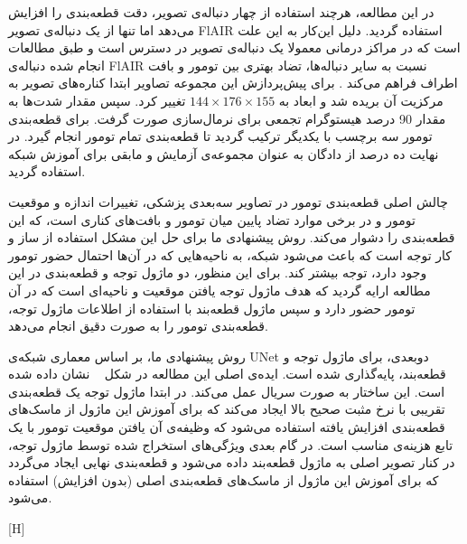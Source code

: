 در این مطالعه، هرچند استفاده از چهار دنباله‌ی تصویر، دقت قطعه‌بندی را افزایش می‌دهد اما تنها از یک دنباله‌ی تصویر FlAIR استفاده گردید. دلیل این‌کار به این علت است که در مراکز درمانی معمولا یک دنباله‌ی تصویر در دسترس است و طبق مطالعات انجام شده دنباله‌ی FlAIR نسبت به سایر دنباله‌ها، تضاد بهتری بین تومور و بافت اطراف فراهم می‌کند . برای پیش‌پردازش این مجموعه تصاویر ابتدا کناره‌های تصویر به مرکزیت آن بریده شد و ابعاد به $144\times176\times155$ تغییر کرد. سپس مقدار شدت‌ها به مقدار 90 درصد هیستوگرام تجمعی برای نرمال‌سازی صورت گرفت. برای قطعه‌بندی تومور سه برچسب با یکدیگر ترکیب گردید تا قطعه‌بندی تمام تومور انجام گیرد. در نهایت ده درصد از دادگان به عنوان مجموعه‌ی آزمایش و مابقی برای آموزش شبکه‌ استفاده گردید.


چالش اصلی قطعه‌بندی تومور در تصاویر سه‌بعدی پزشکی، تغییرات اندازه و موقعیت تومور و در برخی موارد تضاد پایین میان تومور و بافت‌های کناری است، که این قطعه‌بندی را دشوار می‌کند. روش پیشنهادی ما برای حل این مشکل استفاده از ساز و کار توجه است که باعث می‌شود شبکه، به ناحیه‌هایی که در آن‌ها احتمال حضور تومور وجود دارد، توجه بیشتر کند. برای این منظور، دو ماژول توجه و قطعه‌بندی در این مطالعه‌ ارایه گردید که هدف ماژول توجه یافتن موقعیت و ناحیه‌ای است که در آن تومور حضور دارد و سپس ماژول قطعه‌بند با استفاده از اطلاعات ماژول توجه، قطعه‌بندی تومور را به صورت دقیق انجام می‌دهد. 

روش پیشنهادی ما، بر اساس معماری شبکه‌ی UNet دوبعدی، برای ماژول توجه و قطعه‌بند، پایه‌گذاری شده است. ایده‌ی اصلی این مطالعه در شکل ~ نشان داده شده است. این ساختار به صورت سریال عمل می‌کند. در ابتدا ماژول توجه یک قطعه‌بندی تقریبی با نرخ مثبت صحیح بالا ایجاد می‌کند که برای آموزش این ماژول از ماسک‌های قطعه‌بندی افزایش  یافته استفاده می‌شود که وظیفه‌ی آن یافتن موقعیت تومور با یک تابع هزینه‌ی مناسب است. در گام بعدی ویژگی‌های استخراج شده توسط ماژول توجه، در کنار تصویر اصلی به ماژول قطعه‌بند داده می‌شود و قطعه‌بندی نهایی ایجاد می‌گردد که برای آموزش این ماژول از ماسک‌های قطعه‌بندی اصلی (بدون افزایش) استفاده می‌شود.

[H]


